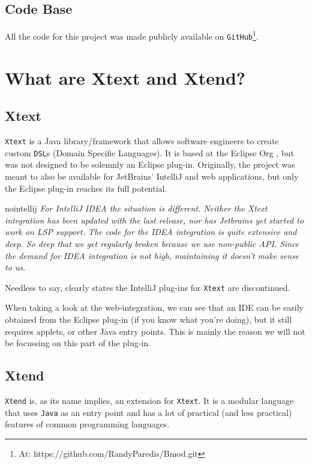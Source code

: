 \documentclass[review]{elsarticle}
\begin{document}
\subsection{Code Base}
All the code for this project was made publicly available on \texttt{GitHub}\footnote{At: https://github.com/RandyParedis/Bmod.git}.




\section{What are Xtext and Xtend?}
\label{sec:xtext}

\subsection{Xtext}
\texttt{Xtext} \cite{xtext} is a \textsf{Java} library/framework that allows software engineers to create custom \texttt{DSL}s (Domain Specific Languages). It is based at the \textsf{Eclipse Org} \cite{eclipse}, but was not designed to be solemnly an \textsf{Eclipse} plug-in. Originally, the project was meant to also be available for \textsf{JetBrains}' \textsf{IntelliJ} and web applications, but only the \textsf{Eclipse} plug-in reaches its full potential.

\begin{displaycquote}{nointellij}
	\textit{For IntelliJ IDEA the situation is different. Neither the Xtext integration has been updated with the last release, nor has Jetbrains yet started to work on LSP support. The code for the IDEA integration is quite extensive and deep. So deep that we get regularly broken because we use non-public API. Since the demand for IDEA integration is not high, maintaining it doesn’t make sense to us.}
\end{displaycquote}

Needless to say, \cite{nointellij} clearly states the \textsf{IntelliJ} plug-ins for \texttt{Xtext} are discontinued.

When taking a look at the web-integration, we can see that an \textsf{IDE} can be easily obtained from the \textsf{Eclipse} plug-in (if you know what you're doing), but it still requires applets, or other \textsf{Java} entry points. This is mainly the reason we will not be focussing on this part of the plug-in.

\subsection{Xtend}
\texttt{Xtend} is, as its name implies, an extension for \texttt{Xtext}. It is a modular language that uses \texttt{Java} as an entry point and has a lot of practical (and less practical) features of common programming languages.
\end{document}
